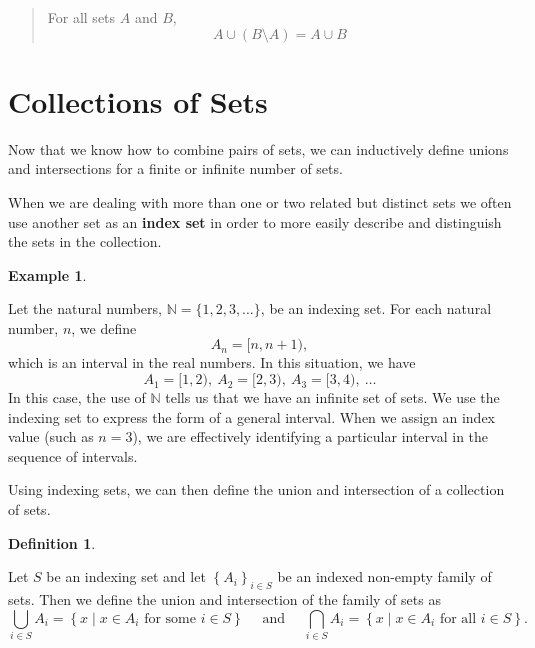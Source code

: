 \documentclass[
]{book}
\theoremstyle{definition}
\newtheorem{definition}{Definition}[chapter]
\theoremstyle{definition}
\newtheorem{example}{Example}[chapter]
\theoremstyle{definition}
\theoremstyle{definition}
\theoremstyle{remark}
\begin{document}
\begin{quote}
For all sets \(A\) and \(B\), \[A \cup (B\setminus A)= A \cup B\]
\end{quote}

\hypertarget{collections-of-sets}{%
\section{Collections of Sets}\label{collections-of-sets}}

Now that we know how to combine pairs of sets, we can inductively define unions and intersections for a finite or infinite number of sets.

When we are dealing with more than one or two related but distinct sets we often use another set as an \textbf{index set} in order to more easily describe and distinguish the sets in the collection.

\begin{example}
\protect\hypertarget{exm:unlabeled-div-19}{}\label{exm:unlabeled-div-19}

Let the natural numbers, \(\mathbb{N}=\{1, 2, 3, \ldots \}\), be an indexing set. For each natural number, \(n\), we define \[A_n = [n,n+1),\] which is an interval in the real numbers. In this situation, we have
\[A_1 = [1,2), \:  A_2 = [2,3), \: A_3 = [3,4),\:  \ldots \]
In this case, the use of \(\mathbb{N}\) tells us that we have an infinite set of sets. We use the indexing set to express the form of a general interval. When we assign an index value (such as \(n=3\)), we are effectively identifying a particular interval in the sequence of intervals.

\end{example}

Using indexing sets, we can then define the union and intersection of a collection of sets.

\begin{definition}
\protect\hypertarget{def:set-indexing}{}\label{def:set-indexing}

Let \(S\) be an indexing set and let \(\left\{ A_i\right\}_{i\in S}\) be an indexed non-empty family of sets. Then we define the union and intersection of the family of sets as
\[\bigcup_{i\in S} A_i = \left\{ x \middle \vert x\in A_i \mbox{ for some } i\in S\right\} \quad \mbox{ and } \quad \bigcap_{i\in S} A_i = \left\{ x\middle \vert x\in A_i \mbox{ for all } i \in S\right\}.\]

\end{definition}
\end{document}
